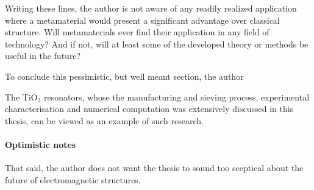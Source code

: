 {Writing these lines, the author is not aware of any readily realized application where a metamaterial would present a significant advantage over classical structure. Will metamaterials ever find their application in any field of technology? And if not, will at least some of the developed theory or methods be useful in the future?

To conclude this pessimistic, but well meant section, the author
}





The TiO$_{2}$ resonators, whose the manufacturing and sieving process, experimental characterisation and numerical computation was extensively discussed in this thesis, can be viewed as an example of such research.

\paragraph{Optimistic notes}
That said, the author does not want the thesis to sound too sceptical about the future of electromagnetic structures. 

